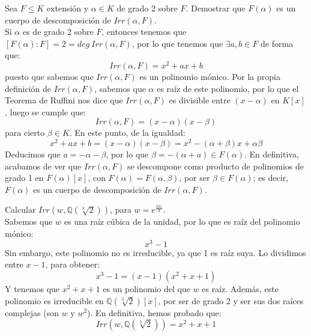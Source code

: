 \begin{ejercicio}
    Sea $F\leq K$ extensión y $\alpha\in K$ de grado 2 sobre $F$. Demostrar que $F(\alpha)$ es un cuerpo de descomposición de $Irr(\alpha,F)$.\\

    \noindent
    Si $\alpha$ es de grado 2 sobre $F$, entonces tenemos que $[F(\alpha):F] = 2 = deg~Irr(\alpha,F)$, por lo que tenemos que $\exists a,b\in F$ de forma que:
    \begin{equation*}
        Irr(\alpha,F) = x^2+ax+b
    \end{equation*}
    puesto que sabemos que $Irr(\alpha,F)$ es un polinomio mónico. Por la propia definición de $Irr(\alpha,F)$, sabemos que $\alpha$ es raíz de este polinomio, por lo que el Teorema de Ruffini nos dice que $Irr(\alpha,F)$ es divisible entre $(x-\alpha)$ en $K[x]$, luego se cumple que:
    \begin{equation*}
        Irr(\alpha,F) = (x-\alpha)(x-\beta)
    \end{equation*}
    para cierto $\beta\in K$. En este punto, de la igualdad:
    \begin{equation*}
        x^2+ax+b = (x-\alpha)(x-\beta) = x^2-(\alpha+\beta)x + \alpha\beta
    \end{equation*}
    Deducimos que $a=-\alpha-\beta$, por lo que $\beta=-(\alpha+a)\in F(\alpha)$. En definitiva, acabamos de ver que $Irr(\alpha,F)$ se descompone como producto de polinomios de grado 1 en $F(\alpha)[x]$, con $F(\alpha) = F(\alpha,\beta)$, por ser $\beta\in F(\alpha)$; es decir, $F(\alpha)$ es un cuerpo de descomposición de $Irr(\alpha,F)$.
\end{ejercicio}

\begin{ejercicio}
    Calcular $Irr(w,\mathbb{Q}(\sqrt[3]{2}))$, para $w=e^{\frac{2\pi i}{3}}$.\\

    \noindent
    Sabemos que $w$ es una raíz cúbica de la unidad, por lo que es raíz del polinomio mónico:
    \begin{equation*}
        x^3-1
    \end{equation*}
    Sin embargo, este polinomio no es irreducible, ya que 1 es raíz suya. Lo dividimos entre $x-1$, para obtener:
    \begin{equation*}
        x^3-1 = (x-1)(x^2+x+1)
    \end{equation*}
    Y tenemos que $x^2+x+1$ es un polinomio del que $w$ es raíz. Además, este polinomio es irreducible en $\mathbb{Q}(\sqrt[3]{2})[x]$, por ser de grado 2 y ser sus dos raíces complejas (son $w$ y $w^2$). En definitiva, hemos probado que:
    \begin{equation*}
        Irr(w,\mathbb{Q}(\sqrt[3]{2})) = x^2+x+1
    \end{equation*}
\end{ejercicio}

